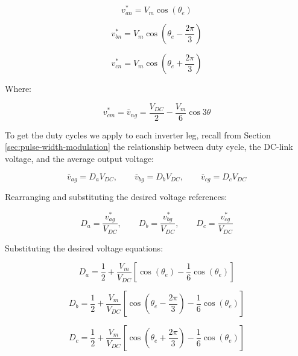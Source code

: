 \documentclass{article}
\begin{document}
\begin{equation}
    v_{an}^* = V_m\cos(\theta_e)
\end{equation}

\begin{equation}
    v_{bn}^* = V_m\cos(\theta_e - \frac{2\pi}{3})
\end{equation}

\begin{equation}
    v_{cn}^* = V_m\cos(\theta_e + \frac{2\pi}{3})
\end{equation}

Where:

\begin{equation}
    v_{cm}^* = \overline{v}_{ng} = \frac{V_{DC}}{2} - \frac{V_m}{6}\cos3\theta
\end{equation}

To get the duty cycles we apply to each inverter leg, recall from Section \ref{sec:pulse-width-modulation} the relationship between duty cycle, the DC-link voltage, and the average output voltage:

\begin{equation}
    \overline{v}_{ag} = D_aV_{DC}, \qquad
    \overline{v}_{bg} = D_bV_{DC}, \qquad
    \overline{v}_{cg} = D_cV_{DC}
\end{equation}

Rearranging and substituting the desired voltage references:

\begin{equation}
    D_a = \frac{v_{ag}^*}{V_{DC}}, \qquad
    D_b = \frac{v_{bg}^*}{V_{DC}}, \qquad
    D_c = \frac{v_{cg}^*}{V_{DC}}
\end{equation}

Substituting the desired voltage equations:

\begin{equation}
    D_a = \frac{1}{2} + \frac{V_m}{V_{DC}}\left[\cos(\theta_e) - \frac{1}{6}\cos(\theta_e)\right]
\end{equation}

\begin{equation}
    D_b = \frac{1}{2} + \frac{V_m}{V_{DC}}\left[\cos(\theta_e - \frac{2\pi}{3}) - \frac{1}{6}\cos(\theta_e)\right]
\end{equation}

\begin{equation}
    D_c = \frac{1}{2} + \frac{V_m}{V_{DC}}\left[\cos(\theta_e + \frac{2\pi}{3}) - \frac{1}{6}\cos(\theta_e)\right]
\end{equation}
\end{document}
